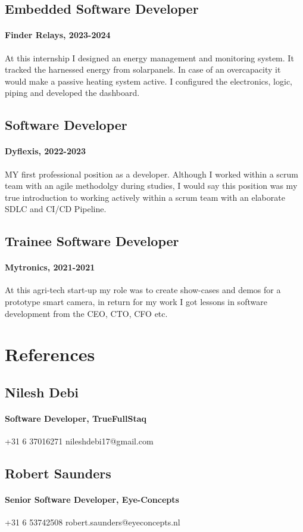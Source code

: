 \documentclass[11pt, twoside, a4paper, titlepage]{article}
\begin{document}
\subsection{Embedded Software Developer}
\paragraph{Finder Relays, 2023-2024}
At this internship I designed an energy management and monitoring system. It tracked the harnessed energy from solarpanels. In case of an overcapacity it would make a passive heating system active. I configured the electronics, logic, piping and developed the dashboard.

\subsection{Software Developer}
\paragraph{Dyflexis, 2022-2023}
MY first professional position as a developer. Although I worked within a scrum team with an agile methodolgy during studies, I would say this position was my true introduction to working actively within a scrum team with an elaborate SDLC and CI/CD Pipeline.

\subsection{Trainee Software Developer}
\paragraph{Mytronics, 2021-2021}
At this agri-tech start-up my role was to create show-cases and demos for a prototype smart camera, in return for my work I got lessons in software development from the CEO, CTO, CFO etc.

\section{References}
\subsection{Nilesh Debi}
\paragraph{Software Developer, TrueFullStaq}
+31 6 37016271
nileshdebi17@gmail.com

\subsection{Robert Saunders}
\paragraph{Senior Software Developer, Eye-Concepts}
+31 6 53742508
robert.saunders@eyeconcepts.nl
\end{document}
